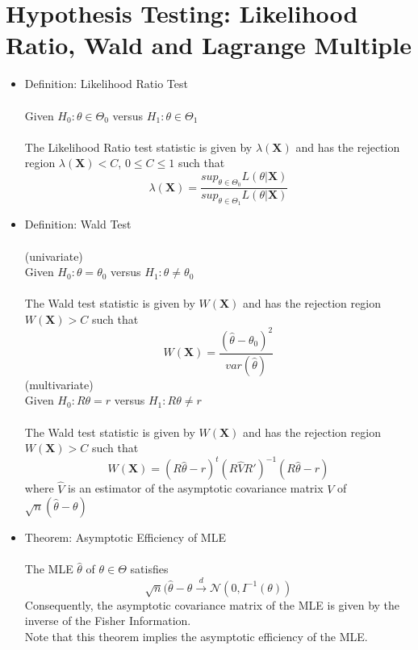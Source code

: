 \documentclass{article}
\begin{document}
\section{Hypothesis Testing: Likelihood Ratio, Wald and Lagrange Multiple}
\begin{itemize}
    \item Definition: Likelihood Ratio Test\\\\
    Given $H_0:\theta\in\Theta_0$ versus $H_1: \theta\in\Theta_1$\\\\
    The Likelihood Ratio test statistic is given by $\lambda(\textbf{X})$ and has the rejection region $\lambda(\textbf{X})<C$, $0\leq C\leq1$ such that\\
$$\lambda(\textbf{X})=\dfrac{sup_{\theta\in\Theta_0}L(\theta|\textbf{X})}{sup_{\theta\in\Theta_1}L(\theta|\textbf{X})}$$
    \item Definition: Wald Test\\\\
    (univariate)\\
    Given $H_0: \theta=\theta_0$ versus $H_1: \theta\neq\theta_0$\\\\
    The Wald test statistic is given by $W(\textbf{X})$ and has the rejection region $W(\textbf{X})>C$ such that\\
    $$W(\textbf{X})=\dfrac{(\hat{\theta}-\theta_0)^2}{var(\hat{\theta})}$$
    (multivariate)\\
    Given $H_0:R\theta=r$ versus $H_1:R\theta\neq r$\\\\
    The Wald test statistic is given by $W(\textbf{X})$ and has the rejection region $W(\textbf{X})>C$ such that\\
    $$W(\textbf{X})=(R\hat{\theta}-r)^t(R\hat{V}R')^{-1}(R\hat{\theta}-r)$$
    where $\hat{V}$ is an estimator of the asymptotic covariance matrix $V$ of $\sqrt{n}(\hat{\theta}-\theta)$
    \item Theorem: Asymptotic Efficiency of MLE\\\\
    The MLE $\hat{\theta}$ of $\theta\in\Theta$ satisfies\\
    $$\sqrt{n}(\hat{\theta}-\theta\xrightarrow{d}\mathcal{N}(0,I^{-1}(\theta))$$
    Consequently, the asymptotic covariance matrix of the MLE is given by the inverse of the Fisher Information.\\
    Note that this theorem implies the asymptotic efficiency of the MLE.
\end{itemize}
\end{document}
